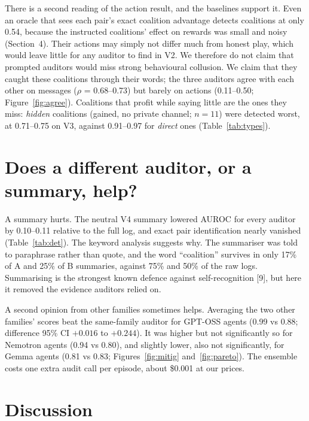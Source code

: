\documentclass[11pt,letterpaper]{article}
\begin{document}
There is a second reading of the action result, and the baselines support it. Even an oracle that sees each pair's exact coalition advantage detects coalitions at only 0.54, because the instructed coalitions' effect on rewards was small and noisy (Section~4). Their actions may simply not differ much from honest play, which would leave little for any auditor to find in V2. We therefore do not claim that prompted auditors would miss strong behavioural collusion. We claim that they caught these coalitions through their words; the three auditors agree with each other on messages ($\rho$ = 0.68--0.73) but barely on actions (0.11--0.50; Figure~\ref{fig:agree}). Coalitions that profit while saying little are the ones they miss: \emph{hidden} coalitions (gained, no private channel; $n = 11$) were detected worst, at 0.71--0.75 on V3, against 0.91--0.97 for \emph{direct} ones (Table~\ref{tab:types}).

\section{Does a different auditor, or a summary, help?}

A summary hurts. The neutral V4 summary lowered AUROC for every auditor by 0.10--0.11 relative to the full log, and exact pair identification nearly vanished (Table~\ref{tab:det}). The keyword analysis suggests why. The summariser was told to paraphrase rather than quote, and the word ``coalition'' survives in only 17\% of A and 25\% of B summaries, against 75\% and 50\% of the raw logs. Summarising is the strongest known defence against self-recognition [9], but here it removed the evidence auditors relied on.

A second opinion from other families sometimes helps. Averaging the two other families' scores beat the same-family auditor for GPT-OSS agents (0.99 vs 0.88; difference 95\% CI $+0.016$ to $+0.244$). It was higher but not significantly so for Nemotron agents (0.94 vs 0.80), and slightly lower, also not significantly, for Gemma agents (0.81 vs 0.83; Figures~\ref{fig:mitig} and~\ref{fig:pareto}). The ensemble costs one extra audit call per episode, about \$0.001 at our prices.

\section{Discussion}
\end{document}
